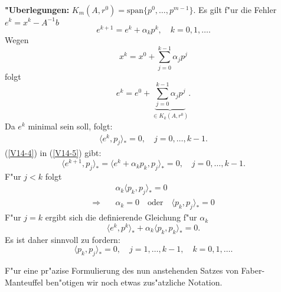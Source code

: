 %
\textbf{"Uberlegungen:} $K_m(A,r^0)= \text{span} \{ p^0,\dots,p^{m-1} \}$. Es gilt f"ur die Fehler $e^k=x^k-A^{-1}b$
\begin{equation}
  e^{k+1}   = e^k+\alpha_kp^k,\quad k=0,1,\dots . \label{V14-4}
\end{equation} 
Wegen
\[
x^k = x^0 + \sum_{j=0}^{k-1}{\alpha_j p^j}
\]
folgt
\[
 e^k = e^0 + \underbrace{\sum_{j=0}^{k-1}{\alpha_j p^j}}_{\in K_k(A,r^0)}.
\]
Da $e^k$ minimal sein soll, folgt:
\begin{align}
 \langle e^k,p_j\rangle_*=0, \quad j=0,\dots,k-1. \label{V14-5}
\end{align}
(\ref{V14-4}) in (\ref{V14-5}) gibt:
\[
\langle e^{k+1},p_j\rangle_*=\langle e^k+\alpha_kp_k, p_j \rangle_*=0,\quad j=0,\dots,k-1.
\]
F"ur $j < k$ folgt 
\begin{align}
&\alpha_k \langle p_k,p_j\rangle_* = 0 \nonumber \\
\Longrightarrow \quad &\alpha_k = 0 \quad \text{oder} \quad \langle p_k,p_j \rangle_*=0 \label{V14-6}
\end{align}
F"ur  $j=k$ ergibt sich die definierende Gleichung f"ur $\alpha_k$\[  \langle e^k,p^k\rangle_*+\alpha_k\langle p_k,p_k\rangle_* = 0.\]
Es ist daher sinnvoll zu fordern:
\begin{equation}
\langle p_k,p_j\rangle_*=0, \quad j=1,\dots,k-1, \quad k=0,1,\dots .\label{V14-7}
\end{equation}

F"ur eine pr"azise Formulierung des nun anstehenden Satzes von Faber-Man\-teuffel
ben"otigen wir noch etwas zus"atzliche Notation.

